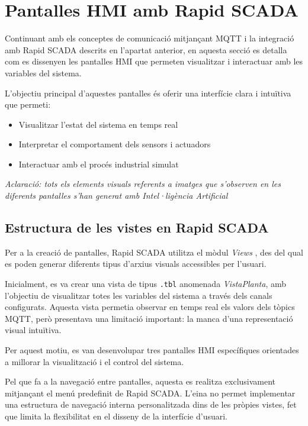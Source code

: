 \documentclass[12pt,a4paper]{report}
\begin{document}
\chapter{Pantalles HMI amb Rapid SCADA}

Continuant amb els conceptes de comunicació mitjançant MQTT i la integració amb Rapid SCADA descrits en l'apartat anterior, en aquesta secció es detalla com es dissenyen les pantalles HMI que permeten visualitzar i interactuar amb les variables del sistema.

L'objectiu principal d'aquestes pantalles és oferir una interfície clara i intuïtiva que permeti:
\begin{itemize}
    \item Visualitzar l'estat del sistema en temps real
    \item Interpretar el comportament dels sensors i actuadors
    \item Interactuar amb el procés industrial simulat
\end{itemize}

\textit{Aclaració: tots els elements visuals referents a imatges que s'observen en les diferents pantalles s'han generat amb Intel·ligència Artificial}
\section{Estructura de les vistes en Rapid SCADA}

Per a la creació de pantalles, Rapid SCADA utilitza el mòdul \textit{Views} \cite{rapidscada_views}, des del qual es poden generar diferents tipus d'arxius visuals accessibles per l'usuari.

Inicialment, es va crear una vista de tipus \texttt{.tbl} anomenada \textit{VistaPlanta}, amb l'objectiu de visualitzar totes les variables del sistema a través dels canals configurats. Aquesta vista permetia observar en temps real els valors dels tòpics MQTT, però presentava una limitació important: la manca d'una representació visual intuïtiva.

Per aquest motiu, es van desenvolupar tres pantalles HMI específiques orientades a millorar la visualització i el control del sistema.

Pel que fa a la navegació entre pantalles, aquesta es realitza exclusivament mitjançant el menú predefinit de Rapid SCADA. L'eina no permet implementar una estructura de navegació interna personalitzada dins de les pròpies vistes, fet que limita la flexibilitat en el disseny de la interfície d'usuari.
\end{document}
